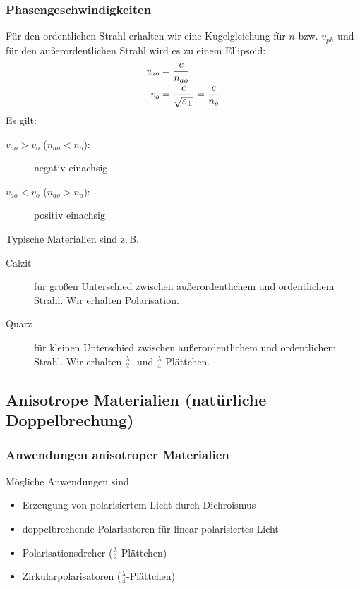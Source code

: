 \subsubsection{Phasengeschwindigkeiten}
Für den ordentlichen Strahl erhalten wir eine Kugelgleichung für $n$
bzw. $v_{ph}$ und für den außerordentlichen Strahl wird es zu einem
Ellipsoid:
\begin{align*}
  v_{ao} &= \frac{c}{n_{ao}}\\
  v_o &= \frac{c}{\sqrt{\varepsilon_\bot}} = \frac{c}{n_{o}}\\
\end{align*}
Es gilt:
\begin{description}
\item[\normalfont $v_{ao}>v_o$ ($n_{ao}<n_o$):] negativ einachsig
\item[\normalfont $v_{ao}<v_o$ ($n_{ao}>n_o$):] positiv einachsig
\end{description}


Typische Materialien sind z.\,B.
\begin{description}
\item[Calzit] für großen Unterschied zwischen außerordentlichem und
  ordentlichem Strahl. Wir erhalten Polarisation.
\item[Quarz] für kleinen Unterschied zwischen außerordentlichem und
  ordentlichem Strahl. Wir erhalten $\frac{\lambda}{2}$- und
  $\frac{\lambda}{4}$-Plättchen.
\end{description}


\subsection[natürliche Doppelbrechung]%
{Anisotrope Materialien (natürliche Doppelbrechung)}
\subsubsection[Anwendungen]%
{Anwendungen anisotroper Materialien}
Mögliche Anwendungen sind
\begin{itemize}
\item Erzeugung von polarisiertem Licht durch Dichroismus
\item doppelbrechende Polarisatoren für linear polarisiertes Licht
\item Polarisationsdreher ($\frac{\lambda}{2}$-Plättchen)
\item Zirkularpolarisatoren ($\frac{\lambda}{4}$-Plättchen)
\end{itemize}

